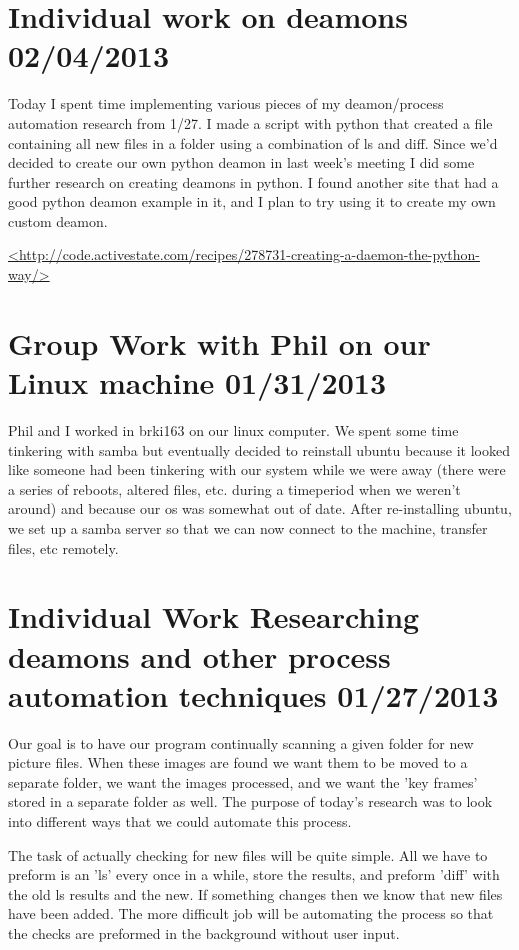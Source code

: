 \documentclass[]{article}
\begin{document}
	
	\section{Individual work on deamons 02/04/2013}
	
	Today I spent time implementing various pieces of my deamon/process automation research from 1/27.
	I made a script with python that created a file containing all new files in a folder using a combination of ls and diff.
	Since we'd decided to create our own python deamon in last week's meeting I did some further research on creating deamons in python. I found another site that had a good python deamon example in it, and I plan to try using it to create my own custom deamon.
	
	\url{<http://code.activestate.com/recipes/278731-creating-a-daemon-the-python-way/>}
	
	\section{Group Work with Phil on our Linux machine 01/31/2013}
	
	Phil and I worked in brki163 on our linux computer. We spent some time tinkering with samba but eventually decided to reinstall ubuntu because it looked like someone had been tinkering with our system while we were away (there were a series of reboots, altered files, etc. during a timeperiod when we weren't around) and because our os was somewhat out of date. After re-installing ubuntu, we set up a samba server so that we can now connect to the machine, transfer files, etc remotely.
	
	\section{Individual Work Researching deamons and other process automation techniques 01/27/2013}	
	
	Our goal is to have our program continually scanning a given folder for new picture files. When these images are found we want them to be moved to a separate folder, we want the images processed, and we want the 'key frames' stored in a separate folder as well. The purpose of today's research was to look into different ways that we could automate this process.
	
	The task of actually checking for new files will be quite simple. All we have to preform is an 'ls' every once in a while, store the results, and preform 'diff' with the old ls results and the new. If something changes then we know that new files have been added.
	The more difficult job will be automating the process so that the checks are preformed in the background without user input.
	
\end{document}
